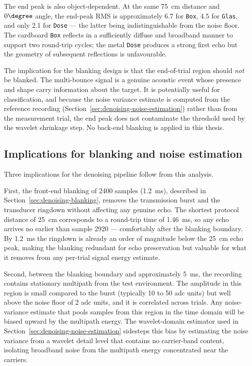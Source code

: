 The end peak is also object-dependent. At the same \SI{75}{cm}
distance and $0\degree$ angle, the end-peak RMS is approximately
\num{6.7} for \texttt{Box}, \num{4.5} for \texttt{Glas}, and only
\num{2.1} for \texttt{Dose} --- the latter being indistinguishable
from the noise floor. The cardboard \texttt{Box} reflects in a
sufficiently diffuse and broadband manner to support two
round-trip cycles; the metal \texttt{Dose} produces a strong first
echo but the geometry of subsequent reflections is unfavourable.

The implication for the blanking design is that the end-of-trial
region should \emph{not} be blanked. The multi-bounce signal is a
genuine acoustic event whose presence and shape carry information
about the target. It is potentially useful for classification, and
because the noise variance estimate is computed from the reference
recording (Section~\ref{sec:denoising-noise-estimation}) rather
than from the measurement trial, the end peak does not contaminate
the threshold used by the wavelet shrinkage step. No back-end
blanking is applied in this thesis.

\subsection{Implications for blanking and noise estimation}
\label{sec:anatomy-implications}

Three implications for the denoising pipeline follow from this
analysis.

First, the front-end blanking of \num{2400} samples
(\SI{1.2}{\milli\second}), described in
Section~\ref{sec:denoising-blanking}, removes the transmission
burst and the transducer ringdown without affecting any genuine
echo. The shortest protocol distance of \SI{25}{cm} corresponds to
a round-trip time of \SI{1.46}{\milli\second}, so any echo arrives
no earlier than sample \num{2920} --- comfortably after the
blanking boundary. By \SI{1.2}{\milli\second} the ringdown is
already an order of magnitude below the \SI{25}{cm} echo peak,
making the blanking redundant for echo preservation but valuable
for what it removes from any per-trial signal energy estimate.

Second, between the blanking boundary and approximately
\SI{5}{\milli\second}, the recording contains stationary multipath
from the test environment. The amplitude in this region is small
compared to the burst (typically \num{10} to \num{50} \gls{adc}
units) but well above the noise floor of \num{2} \gls{adc} units,
and it is correlated across trials. Any noise-variance estimate
that pools samples from this region in the time domain will be
biased upward by the multipath energy. The wavelet-domain
estimator used in Section~\ref{sec:denoising-noise-estimation}
sidesteps this bias by estimating the noise variance from a wavelet
detail level that contains no carrier-band content, isolating
broadband noise from the multipath energy concentrated near the
carriers.

